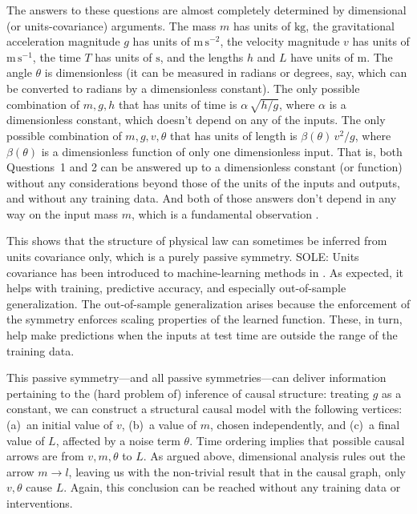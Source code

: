 \documentclass{article}
\theoremstyle{plain}
\theoremstyle{definition}
\theoremstyle{remark}
\newcommand{\unit}[1]{\mathrm{#1}}
\newcommand{\kg}{\unit{kg}}
\newcommand{\m}{\unit{m}}
\newcommand{\s}{\unit{s}}
\begin{document}
The answers to these questions are almost completely determined by dimensional (or units-covariance) arguments.
The mass $m$ has units of $\kg$, the gravitational acceleration magnitude $g$ has units of $\m\,\s^{-2}$, the velocity magnitude $v$ has units of $\m\,\s^{-1}$, the time $T$ has units of $\s$, and the lengths $h$ and $L$ have units of $\m$.
The angle $\theta$ is dimensionless (it can be measured in radians or degrees, say, which can be converted to radians by a dimensionless constant).
The only possible combination of $m, g, h$ that has units of time is $\alpha\,\sqrt{h/g}$, where $\alpha$ is a dimensionless constant, which doesn't depend on any of the inputs.
The only possible combination of $m, g, v, \theta$ that has units of length is $\beta(\theta)\,v^2/g$, where $\beta(\theta)$ is a dimensionless function of only one dimensionless input.
That is, both Questions~1 and 2 can be answered up to a dimensionless constant (or function) without any considerations beyond those of the units of the inputs and outputs, and without any training data.
And both of those answers don't depend in any way on the input mass $m$, which is a fundamental observation \cite{gr}.

This shows that the structure of physical law can sometimes be inferred from units covariance only, which is a purely passive symmetry.
SOLE: Units covariance has been introduced to machine-learning methods in \cite{villar2022dimensionless, 
SOLE-OTHERS}.
As expected, it helps with training, predictive accuracy, and especially out-of-sample generalization.
The out-of-sample generalization arises because the enforcement of the symmetry enforces scaling properties of the learned function.
These, in turn, help make predictions when the inputs at test time are outside the range of the training data.

This passive symmetry---and all passive symmetries---can deliver information pertaining to the (hard problem of) inference of causal structure:
treating $g$ as a constant, we can construct a structural causal model with the following vertices: (a)~an initial value of $v$, (b)~a value of $m$, chosen independently, and (c)~a final value of $L$, affected by a noise term $\theta$.
Time ordering implies that possible causal arrows are from $v, m, \theta$ to $L$.
As argued above, dimensional analysis rules out the arrow $m\to l$, leaving us with the non-trivial result that in the causal graph, only $v,\theta$ cause $L$.
Again, this conclusion can be reached without any training data or interventions.
\end{document}

